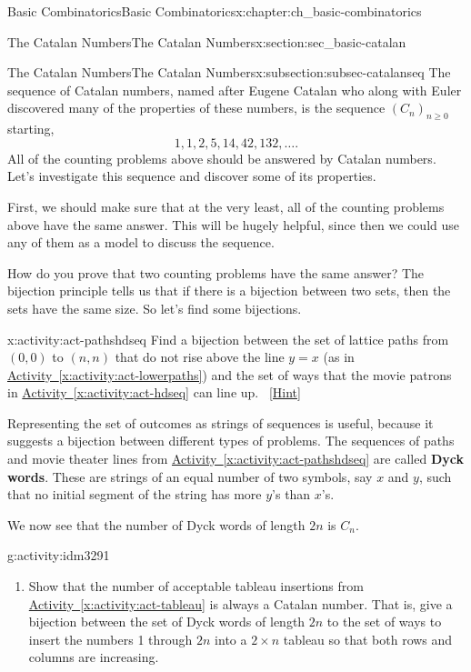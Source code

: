 \documentclass[oneside,10pt,]{book}
\newcommand{\terminology}[1]{\textbf{#1}}
\numberwithin{equation}{chapter}
\begin{document}
\begin{chapterptx}{Basic Combinatorics}{}{Basic Combinatorics}{}{}{x:chapter:ch_basic-combinatorics}
\begin{sectionptx}{The Catalan Numbers}{}{The Catalan Numbers}{}{}{x:section:sec_basic-catalan}
\typeout{************************************************}
%
\begin{subsectionptx}{The Catalan Numbers}{}{The Catalan Numbers}{}{}{x:subsection:subsec-catalanseq}
The sequence of Catalan numbers, named after Eugene Catalan who along with Euler discovered many of the properties of these numbers, is the sequence \((C_n)_{n \ge 0}\) starting,%
\begin{equation*}
1, 1, 2, 5, 14, 42, 132, \ldots\text{.}
\end{equation*}
All of the counting problems above should be answered by Catalan numbers.  Let's investigate this sequence and discover some of its properties.%
\par
First, we should make sure that at the very least, all of the counting problems above have the same answer.  This will be hugely helpful, since then we could use any of them as a model to discuss the sequence.%
\par
How do you prove that two counting problems have the same answer?  The bijection principle tells us that if there is a bijection between two sets, then the sets have the same size.  So let's find some bijections.%
\begin{activity}{}{x:activity:act-pathshdseq}%
Find a bijection between the set of lattice paths from \((0,0)\) to \((n,n)\) that do not rise above the line \(y = x\) (as in \hyperref[x:activity:act-lowerpaths]{Activity~\ref{x:activity:act-lowerpaths}}) and the set of ways that the movie patrons in \hyperref[x:activity:act-hdseq]{Activity~\ref{x:activity:act-hdseq}} can line up.%
\qquad~\hfill{\tiny\hyperlink{g:hint:idm3279-back}{[Hint]}}\end{activity}
Representing the set of outcomes as strings of sequences is useful, because it suggests a bijection between different types of problems.  The sequences of paths and movie theater lines from \hyperref[x:activity:act-pathshdseq]{Activity~\ref{x:activity:act-pathshdseq}} are called \terminology{Dyck words}.  These are strings of an equal number of two symbols, say \(x\) and \(y\), such that no initial segment of the string has more \(y\)'s than \(x\)'s.%
\par
We now see that the number of Dyck words of length \(2n\) is \(C_n\).%
\begin{activity}{}{g:activity:idm3291}%
\begin{enumerate}[font=\bfseries,label=(\alph*),ref=\alph*]
\item{}Show that the number of acceptable tableau insertions from \hyperref[x:activity:act-tableau]{Activity~\ref{x:activity:act-tableau}} is always a Catalan number.  That is, give a bijection between the set of Dyck words of length \(2n\) to the set of ways to insert the numbers 1 through \(2n\) into a \(2\times n\) tableau so that both rows and columns are increasing.%

\end{enumerate}
\end{activity}
\end{subsectionptx}
\end{sectionptx}
\end{chapterptx}
\end{document}
